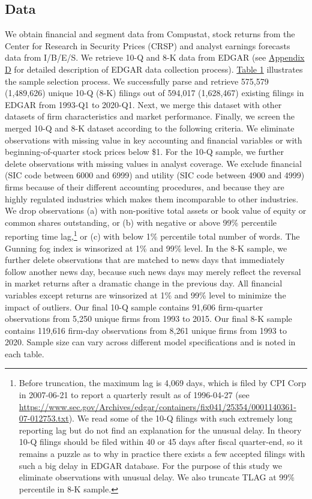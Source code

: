 \documentclass[letterpaper,12pt]{article}
\begin{document}
\begin{spacing}{1.5}
\subsection{Data}
\noindent We obtain financial and segment data from Compustat, stock returns from the Center for Research in Security Prices (CRSP) and analyst earnings forecasts data from I/B/E/S. We retrieve 10-Q and 8-K data from EDGAR (see \hyperref[appd]{Appendix D} for detailed description of EDGAR data collection process). \hyperref[T1]{Table 1} illustrates the sample selection process. We successfully parse and retrieve 575,579 (1,489,626) unique 10-Q (8-K) filings out of 594,017 (1,628,467) existing filings in EDGAR from 1993-Q1 to 2020-Q1. Next, we merge this dataset with other datasets of firm characteristics and market performance. Finally, we screen the merged 10-Q and 8-K dataset according to the following criteria. We eliminate observations with missing value in key accounting and financial variables or with beginning-of-quarter stock prices below \$1. For the 10-Q sample, we further delete observations with missing values in analyst coverage. We exclude financial (SIC code between 6000 and 6999) and utility (SIC code between 4900 and 4999) firms because of their different accounting procedures, and because they are highly regulated industries which makes them incomparable to other industries. We drop observations (a) with non-positive total assets or book value of equity or common shares outstanding, or (b) with negative or above 99\% percentile reporting time lag,\footnote{Before truncation, the maximum lag is 4,069 days, which is filed by CPI Corp in 2007-06-21 to report a quarterly result as of 1996-04-27 (see \url{https://www.sec.gov/Archives/edgar/containers/fix041/25354/0001140361-07-012753.txt}). We read some of the 10-Q filings with such extremely long reporting lag but do not find an explanation for the unusual delay. In theory 10-Q filings should be filed within 40 or 45 days after fiscal quarter-end, so it remains a puzzle as to why in practice there exists a few accepted filings with such a big delay in EDGAR database. For the purpose of this study we eliminate observations with unusual delay. We also truncate TLAG at 99\% percentile in 8-K sample.} or (c) with below 1\% percentile total number of words. The Gunning fog index is winsorized at 1\% and 99\% level. In the 8-K sample, we further delete observations that are matched to news days that immediately follow another news day, because such news days may merely reflect the reversal in market returns after a dramatic change in the previous day. All financial variables except returns are winsorized at 1\% and 99\% level to minimize the impact of outliers. Our final 10-Q sample contains 91,606 firm-quarter observations from 5,250 unique firms from 1993 to 2015. Our final 8-K sample contains 119,616 firm-day observations from 8,261 unique firms from 1993 to 2020. Sample size can vary across different model specifications and is noted in each table. 


\end{spacing}
\end{document}
